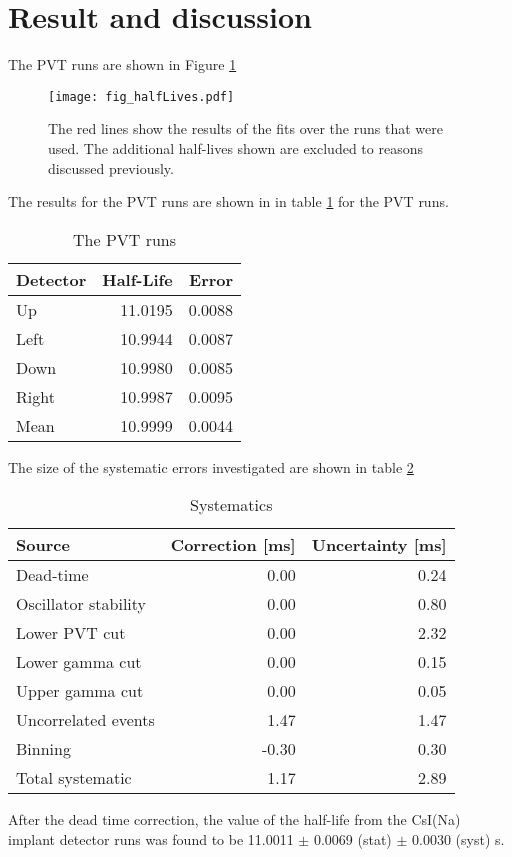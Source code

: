 \section{Result and discussion}
\label{sec:result}

The PVT runs are shown in Figure \ref{fig:PVT2by2}

\begin{figure}[!htb]
	\centerline{\texttt{[image: fig\_halfLives.pdf]}}
	\caption{The red lines show the results of the fits over the runs that were used.
		 The additional half-lives shown are excluded to reasons discussed previously. 
		}
	\label{fig:PVT2by2}
\end{figure}

The results for the PVT runs are shown in  in table \ref{tab:PVTTable} for the PVT runs.

	\begin{table}[!hbt]
			\centering
			\caption{The PVT runs}
			\begin{tabular}{l|r|r}
			Detector & Half-Life & Error \\ \hline
			Up & 11.0195 & 0.0088 \\
			Left & 10.9944 & 0.0087 \\
			Down & 10.9980 & 0.0085 \\
			Right & 10.9987 & 0.0095 \\ \hline
			Mean & 10.9999 & 0.0044
			\end{tabular}
			\label{tab:PVTTable}
	\end{table}

The size of the systematic errors investigated are shown in table \ref{tab:SysTable} 

\begin{table}[!hbt]
	\caption{Systematics}
	\centering
	\label{tab:err-budget}
		\begin{tabular}{l|r|r}
		Source & Correction [ms] & Uncertainty [ms] \\ \hline
		Dead-time & 0.00 & 0.24 \\
		Oscillator stability & 0.00 & 0.80 \\
		Lower PVT cut & 0.00 & 2.32 \\
		Lower gamma cut & 0.00 &  0.15\\
		Upper gamma cut  & 0.00 & 0.05 \\ 
		Uncorrelated events & 1.47 & 1.47 \\
		Binning & -0.30 & 0.30 \\ \hline
		Total systematic & 1.17 & 2.89
		\end{tabular}
	\label{tab:SysTable}
\end{table}
After the dead time correction, the value of the half-life from the CsI(Na) implant detector runs was found to be 11.0011 $\pm$ 0.0069 (stat) $\pm$ 0.0030 (syst) s.

